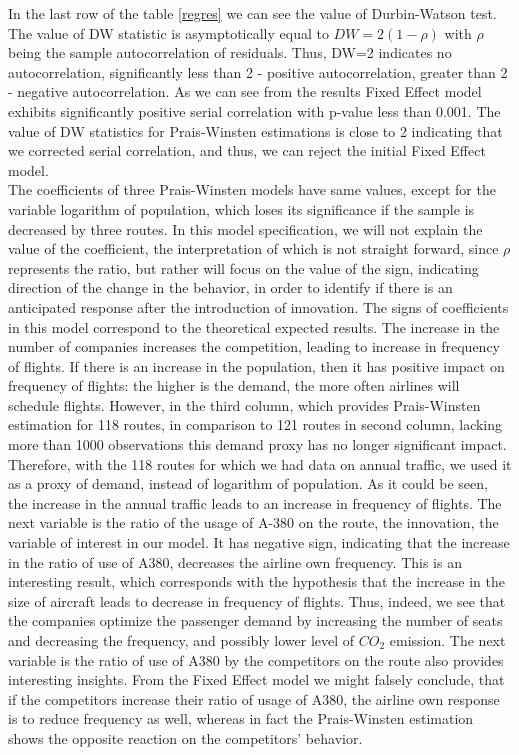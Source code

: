 \documentclass[titlepage, 11pt]{article}
\begin{document}
In the last row of the table \ref{regres} we can see the value of Durbin-Watson test. The value of DW statistic is asymptotically equal to $DW = 2(1-\rho)$ with $\rho$ being the sample autocorrelation of residuals. Thus, DW=2 indicates no autocorrelation, significantly less than 2 - positive autocorrelation, greater than 2 - negative autocorrelation. As we can see from the results Fixed Effect model exhibits significantly positive serial correlation with p-value less than 0.001. The value of DW statistics for Prais-Winsten estimations is close to 2 indicating that we  corrected serial correlation, and thus, we can reject the initial Fixed Effect model. \\ 
\tab The coefficients of three Prais-Winsten models have same values, except for the variable logarithm of population, which loses its significance if the sample is decreased by three routes. In this model specification, we will not explain the value of the coefficient, the interpretation of which is not straight forward, since $\rho$ represents the ratio, but rather  will focus on the value of the sign, indicating direction of the change in the behavior, in order to identify if there is an anticipated response after the introduction of innovation. The signs of coefficients in this model correspond to the theoretical expected results. The increase in the number of companies increases the competition, leading to increase in frequency of flights. If there is an increase in the population, then it has positive impact on frequency of flights: the higher is the demand, the more often airlines will schedule flights. However, in the third column, which provides Prais-Winsten estimation for 118 routes, in comparison to 121 routes in second column, lacking more than 1000 observations this demand proxy has no longer significant impact. Therefore, with the 118 routes for which we had data on annual traffic, we used it as a proxy of demand, instead of logarithm of population.  As it could be seen, the increase in the annual traffic leads to an increase in frequency of flights. The next variable is the ratio of the usage of A-380  on the route, the innovation, the variable of interest in our model. It has negative sign, indicating that the increase in the ratio of use of A380, decreases the airline own frequency. This is an interesting result, which corresponds with the hypothesis that the increase in the size of aircraft leads to decrease in frequency of flights. Thus, indeed, we see that the companies optimize the passenger demand by increasing the number of seats and decreasing the frequency, and possibly lower level of $CO_2$ emission. The next variable is the ratio of use of A380 by the competitors on the route also provides interesting insights. From the Fixed Effect model we might falsely conclude, that if the competitors increase their ratio of usage of A380, the airline own response is to reduce frequency as well, whereas in fact the Prais-Winsten estimation shows the opposite reaction on the competitors’ behavior.
\end{document}
